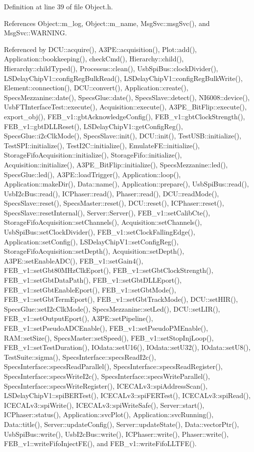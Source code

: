 Definition at line 39 of file Object.h.

References Object::m\_\-log, Object::m\_\-name, MsgSvc::msgSvc(), and MsgSvc::WARNING.

Referenced by DCU::acquire(), A3PE::acquisition(), Plot::add(), Application::bookkeeping(), checkCmd(), Hierarchy::child(), Hierarchy::childTyped(), Processus::clean(), UsbSpiBus::clockDivider(), LSDelayChipV1::configRegBulkRead(), LSDelayChipV1::configRegBulkWrite(), Element::connection(), DCU::convert(), Application::create(), SpecsMezzanine::date(), SpecsGlue::date(), SpecsSlave::detect(), NI6008::device(), UsbFTInterfaceTest::execute(), Acquisition::execute(), A3PE\_\-BitFlip::execute(), export\_\-obj(), FEB\_\-v1::gbtAcknowledgeConfig(), FEB\_\-v1::gbtClockStrength(), FEB\_\-v1::gbtDLLReset(), LSDelayChipV1::getConfigReg(), SpecsGlue::i2cClkMode(), SpecsSlave::init(), DCU::init(), TestUSB::initialize(), TestSPI::initialize(), TestI2C::initialize(), EmulateFE::initialize(), StorageFifoAcquisition::initialize(), StorageFifo::initialize(), Acquisition::initialize(), A3PE\_\-BitFlip::initialize(), SpecsMezzanine::led(), SpecsGlue::led(), A3PE::loadTrigger(), Application::loop(), Application::makeDir(), Data::name(), Application::prepare(), UsbSpiBus::read(), UsbI2cBus::read(), ICPhaser::read(), Phaser::read(), DCU::readMode(), SpecsSlave::reset(), SpecsMaster::reset(), DCU::reset(), ICPhaser::reset(), SpecsSlave::resetInternal(), Server::Server(), FEB\_\-v1::setCalibCte(), StorageFifoAcquisition::setChannels(), Acquisition::setChannels(), UsbSpiBus::setClockDivider(), FEB\_\-v1::setClockFallingEdge(), Application::setConfig(), LSDelayChipV1::setConfigReg(), StorageFifoAcquisition::setDepth(), Acquisition::setDepth(), A3PE::setEnableADC(), FEB\_\-v1::setGain4(), FEB\_\-v1::setGbt80MHzClkEport(), FEB\_\-v1::setGbtClockStrength(), FEB\_\-v1::setGbtDataPath(), FEB\_\-v1::setGbtDLLEport(), FEB\_\-v1::setGbtEnableEport(), FEB\_\-v1::setGbtMode(), FEB\_\-v1::setGbtTermEport(), FEB\_\-v1::setGbtTrackMode(), DCU::setHIR(), SpecsGlue::setI2cClkMode(), SpecsMezzanine::setLed(), DCU::setLIR(), FEB\_\-v1::setOutputEport(), A3PE::setPipeline(), FEB\_\-v1::setPseudoADCEnable(), FEB\_\-v1::setPseudoPMEnable(), RAM::setSize(), SpecsMaster::setSpeed(), FEB\_\-v1::setStopInjLoop(), FEB\_\-v1::setTestDuration(), IOdata::setU16(), IOdata::setU32(), IOdata::setU8(), TestSuite::sigma(), SpecsInterface::specsReadI2c(), SpecsInterface::specsReadParallel(), SpecsInterface::specsReadRegister(), SpecsInterface::specsWriteI2c(), SpecsInterface::specsWriteParallel(), SpecsInterface::specsWriteRegister(), ICECALv3::spiAddressScan(), LSDelayChipV1::spiBERTest(), ICECALv3::spiFERTest(), ICECALv3::spiRead(), ICECALv3::spiWrite(), ICECALv3::spiWriteSafe(), Server::start(), ICPhaser::status(), Application::svcPlot(), Application::svcRunning(), Data::title(), Server::updateConfig(), Server::updateState(), Data::vectorPtr(), UsbSpiBus::write(), UsbI2cBus::write(), ICPhaser::write(), Phaser::write(), FEB\_\-v1::writeFifoInjectFE(), and FEB\_\-v1::writeFifoLLTFE().


